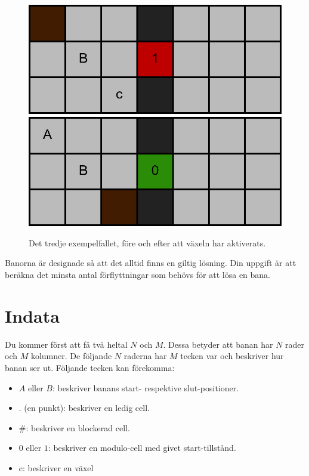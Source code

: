 \begin{figure}[!htb]
\includegraphics[width=\linewidth]{m0.png}
\endminipage\hfill
{}
\includegraphics[width=\linewidth]{m1.png}
\endminipage
\caption{Det tredje exempelfallet, före och efter att växeln har aktiverats.}
\end{figure}

Banorna är designade så att det alltid finns en giltig lösning. Din uppgift är att beräkna det minsta antal förflyttningar som behövs för att lösa en bana.

\section*{Indata}

Du kommer först att få två heltal $N$ och $M$. Dessa betyder att banan har $N$ rader och $M$ kolumner.
De följande $N$ raderna har $M$ tecken var och beskriver hur banan ser ut. Följande tecken kan förekomma:

\begin{itemize}
\item $A$ eller $B$: beskriver banans start- respektive slut-positioner.
\item . (en punkt): beskriver en ledig cell.
\item \#: beskriver en blockerad cell.
\item $0$ eller $1$: beskriver en modulo-cell med givet start-tillstånd.
\item c: beskriver en växel
\end{itemize}

